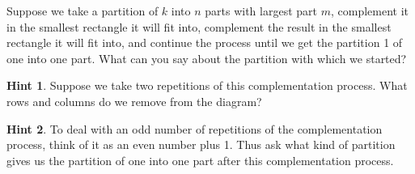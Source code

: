 \documentclass{book}
\begin{document}
\setcounter{cpjt}{309}
\addtocounter{cpjt}{-1}
\begin{activity}\label{activity-302}
\hypertarget{p-1531}{}%
Suppose we take a partition of \(k\) into \(n\) parts with largest part \(m\), complement it in the smallest rectangle it will fit into, complement the result in the smallest rectangle it will fit into, and continue the process until we get the partition 1 of one into one part.  What can you say about the partition with which we started?%
\par\smallskip%
\noindent\textbf{Hint 1}.\hypertarget{hint-196}{}\quad%
\hypertarget{p-1532}{}%
Suppose we take two repetitions of this complementation process. What rows and columns do we remove from the diagram?%
\par\smallskip%
\noindent\textbf{Hint 2}.\hypertarget{hint-197}{}\quad%
\hypertarget{p-1533}{}%
To deal with an odd number of repetitions of the complementation process, think of it as an even number plus 1. Thus ask what kind of partition gives us the partition of one into one part after this complementation process.%
\par\smallskip%
\noindent\end{activity}

\clearpage
\end{document}
